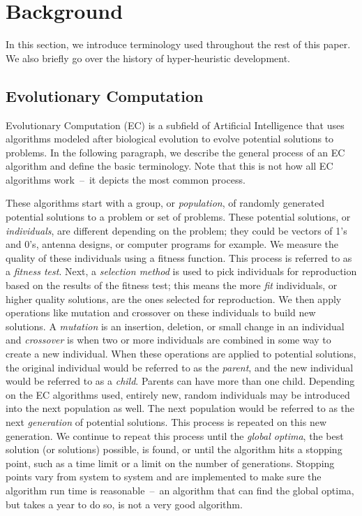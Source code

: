 \documentclass{sig-alternate}
\begin{document}
\section{Background}
\label{sec:background}
In this section, we introduce terminology used throughout the rest of this paper. We also briefly go over the history of hyper-heuristic development.

\subsection{Evolutionary Computation}
\label{sec:evocomp}
Evolutionary Computation (EC) is a subfield of Artificial Intelligence that uses algorithms modeled after biological evolution to evolve potential solutions to problems. In the following paragraph, we describe the general process of an EC algorithm and define the basic terminology. Note that this is not how all EC algorithms work~--~it depicts the most common process.

These algorithms start with a group, or \textit{population}, of randomly generated potential solutions to a problem or set of problems. These potential solutions, or \textit{individuals}, are different depending on the problem; they could be vectors of 1's and 0's, antenna designs, or computer programs for example. We measure the quality of these individuals using a fitness function. This process is referred to as a \textit{fitness test}. Next, a \textit{selection method} is used to pick individuals for reproduction based on the results of the fitness test; this means the more \textit{fit} individuals, or higher quality solutions, are the ones selected for reproduction. We then apply operations like mutation and crossover on these individuals to build new solutions. A \textit{mutation} is an insertion, deletion, or small change in an individual and \textit{crossover} is when two or more individuals are combined in some way to create a new individual. When these operations are applied to potential solutions, the original individual would be referred to as the \textit{parent}, and the new individual would be referred to as a \textit{child}. Parents can have more than one child. Depending on the EC algorithms used, entirely new, random individuals may be introduced into the next population as well. The next population would be referred to as the next \textit{generation} of potential solutions. This process is repeated on this new generation. We continue to repeat this process until the \textit{global optima}, the best solution (or solutions) possible, is found, or until the algorithm hits a stopping point, such as a time limit or a limit on the number of generations. Stopping points vary from system to system and are implemented to make sure the algorithm run time is reasonable~--~an algorithm that can find the global optima, but takes a year to do so, is not a very good algorithm.
\end{document}
